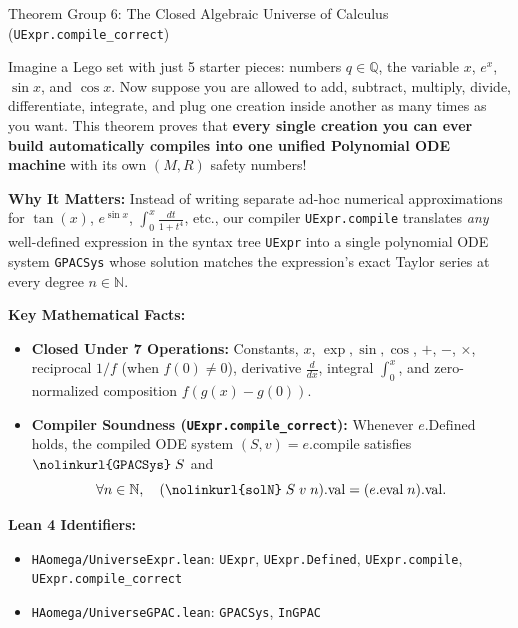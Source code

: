 \documentclass[11pt,a4paper]{article}
\newcommand{\N}{\ensuremath{\mathbb{N}}}
\newcommand{\Q}{\ensuremath{\mathbb{Q}}}
\newcommand{\lean}[1]{\texttt{\nolinkurl{#1}}}
\begin{document}
\vspace{6pt}

\begin{thmcard}{Theorem Group 6: The Closed Algebraic Universe of Calculus (\lean{UExpr.compile\_correct})}
\begin{eli5box}
Imagine a Lego set with just 5 starter pieces: numbers $q \in \Q$, the variable $x$, $e^x$, $\sin x$, and $\cos x$. Now suppose you are allowed to add, subtract, multiply, divide, differentiate, integrate, and plug one creation inside another as many times as you want. This theorem proves that \textbf{every single creation you can ever build automatically compiles into one unified Polynomial ODE machine} with its own $(M, R)$ safety numbers!
\end{eli5box}

\textbf{Why It Matters:}
Instead of writing separate ad-hoc numerical approximations for $\tan(x)$, $e^{\sin x}$, $\int_0^x \frac{dt}{1+t^4}$, etc., our compiler \lean{UExpr.compile} translates \emph{any} well-defined expression in the syntax tree \lean{UExpr} into a single polynomial ODE system \lean{GPACSys} whose solution matches the expression's exact Taylor series at every degree $n \in \N$.

\textbf{Key Mathematical Facts:}
\begin{itemize}
  \item \textbf{Closed Under 7 Operations:} Constants, $x$, $\exp, \sin, \cos$, $+$, $-$, $\times$, reciprocal $1/f$ (when $f(0) \neq 0$), derivative $\frac{d}{dx}$, integral $\int_0^x$, and zero-normalized composition $f(g(x) - g(0))$.
  \item \textbf{Compiler Soundness (\lean{UExpr.compile_correct}):} Whenever $e.\mathrm{Defined}$ holds, the compiled ODE system $(S, v) = e.\mathrm{compile}$ satisfies $\lean{GPACSys}\;S$ and
  \[
    \forall n \in \N,\quad (\lean{solN}\;S\;v\;n).\mathrm{val} = (e.\mathrm{eval}\;n).\mathrm{val}.
  \]
\end{itemize}

\textbf{Lean 4 Identifiers:}
\begin{itemize}
  \item \lean{HAomega/UniverseExpr.lean}: \lean{UExpr}, \lean{UExpr.Defined}, \lean{UExpr.compile}, \lean{UExpr.compile_correct}
  \item \lean{HAomega/UniverseGPAC.lean}: \lean{GPACSys}, \lean{InGPAC}
\end{itemize}
\end{thmcard}

\vspace{6pt}
\end{document}
